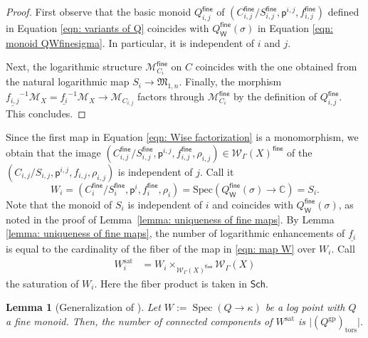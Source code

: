 \documentclass{article}
\def\C{\mathbb{C}}
\def\WG{\mathcal{W}_{\Gamma}}
\newtheorem{lemma}[definition]{Lemma}
\newcommand{\sat}{\mathrm{sat}}
\newcommand{\fine}{\mathsf{fine}}
\newcommand{\W}{\mathsf{W}}
\begin{document}
\begin{proof}
     First observe that the basic monoid $Q_{i,j}^{\mathsf{fine}}$ of $(C_{i,j}^{\mathsf{fine}}/S_{i,j}^{\mathsf{fine}} , \mathsf{p}^{i,j}, f_{i,j}^{\mathsf{fine}})$ defined in Equation \eqref{eqn: variants of Q} coincides with $Q_\W^\fine(\sigma)$ in Equation \eqref{eqn: monoid QWfinesigma}. In particular, it is independent of $i$ and $j$.

    
    Next, the logarithmic structure $\mathcal{M}_{C_i}^{\mathsf{fine}}$ on $C$ coincides with the one obtained from the natural logarithmic map
    $
    S_i \longrightarrow \mathfrak{M}_{1,n}.
    $ 
    Finally, the morphism
    $
    \underline{f_{i,j}}^{-1}\mathcal{M}_X= \underline{f_{i}}^{-1}\mathcal{M}_X \longrightarrow \mathcal{M}_{C_{i,j}}
    $
    factors through $\mathcal{M}_{C_i}^{\mathsf{fine}}$ by the definition of $Q_{i,j}^{\mathsf{fine}}$. This concludes.
    
\end{proof}


Since the first map in Equation \eqref{eqn: Wise factorization} is a monomorphism, we obtain that the image $(C_{i,j}^{\mathsf{fine}}/S_{i,j}^{\mathsf{fine}}, \mathsf{p}^{i,j}, f_{i,j}^{\mathsf{fine}}, \rho_{i,j}) \in \WG(X)^{\fine}$ of the $(C_{i,j}/S_{i,j}, \mathsf{p}^{i,j}, f_{i,j}, \rho_{i,j})$ is independent of $j$. Call it 
$$
W_i=(C_{i}^{\mathsf{fine}}/S_{i}^{\mathsf{fine}}, \mathsf{p}^{i}, f_{i}^{\mathsf{fine}}, \rho_{i})= \mathrm{Spec}(Q_{\W}^{\fine}(\sigma) \to \C)=S_i.
$$
Note that the monoid of $S_i$ is independent of $i$ and coincides with $Q_{\mathsf{W}}^{\mathsf{fine}}(\sigma)$, as noted in the proof of Lemma~\ref{lemma: uniqueness of fine maps}. By Lemma \ref{lemma: uniqueness of fine maps}, the number of logarithmic enhancements of $\underline{f_i}$ is equal to the cardinality of the fiber of the  map in \eqref{eqn: map W} over $W_i$. Call 
\[
\begin{aligned}
W_i^{\sat}
&= W_i 
  \times_{\WG(X)^{\fine}} 
   \WG(X)
\end{aligned}
\]
the saturation of $W_i$. Here the fiber product is taken in $\mathsf{Sch}$. 

\begin{lemma}[Generalization of {\cite[Lemma 3.1]{Gross23}}]\label{lemma: generalization of Mark}
Let \( W := \operatorname{Spec}(Q \to \kappa) \) be a log point with \( Q \) a fine monoid. Then, the number of connected components of \( W^{\mathrm{sat}} \) is \( \lvert (Q^{\mathrm{gp}})_{\mathrm{tors}} \rvert \).
    
\end{lemma}
\end{document}

